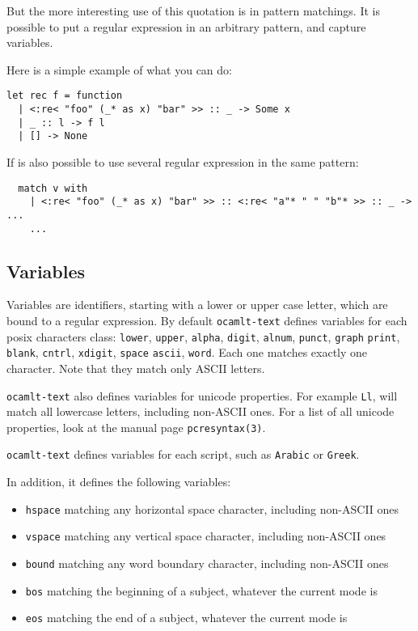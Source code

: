 \documentclass{article}
\newcommand{\oct}{\texttt{ocamlt-text}\xspace}
\begin{document}
But the more interesting use of this quotation is in pattern
matchings. It is possible to put a regular expression in an arbitrary
pattern, and capture variables.

Here is a simple example of what you can do:

\begin{verbatim}
let rec f = function
  | <:re< "foo" (_* as x) "bar" >> :: _ -> Some x
  | _ :: l -> f l
  | [] -> None
\end{verbatim}

If is also possible to use several regular expression in the same
pattern:

\begin{verbatim}
  match v with
    | <:re< "foo" (_* as x) "bar" >> :: <:re< "a"* " " "b"* >> :: _ -> ...
    ...
\end{verbatim}

\subsection{Variables}

Variables are identifiers, starting with a lower or upper case letter,
which are bound to a regular expression. By default \oct defines
variables for each posix characters class: \texttt{lower},
\texttt{upper}, \texttt{alpha}, \texttt{digit}, \texttt{alnum},
\texttt{punct}, \texttt{graph} \texttt{print}, \texttt{blank},
\texttt{cntrl}, \texttt{xdigit}, \texttt{space} \texttt{ascii},
\texttt{word}. Each one matches exactly one character. Note that they
match only ASCII letters.

\oct also defines variables for unicode properties. For example
\texttt{Ll}, will match all lowercase letters, including non-ASCII
ones. For a list of all unicode properties, look at the manual page
\texttt{pcresyntax(3)}.

\oct defines variables for each script, such as \texttt{Arabic} or
\texttt{Greek}.

In addition, it defines the following variables:

\begin{itemize}
\item \texttt{hspace} matching any horizontal space character, including non-ASCII ones
\item \texttt{vspace} matching any vertical space character, including non-ASCII ones
\item \texttt{bound} matching any word boundary character, including non-ASCII ones
\item \texttt{bos} matching the beginning of a subject, whatever the current mode is
\item \texttt{eos} matching the end of a subject, whatever the current mode is
\end{itemize}
\end{document}
